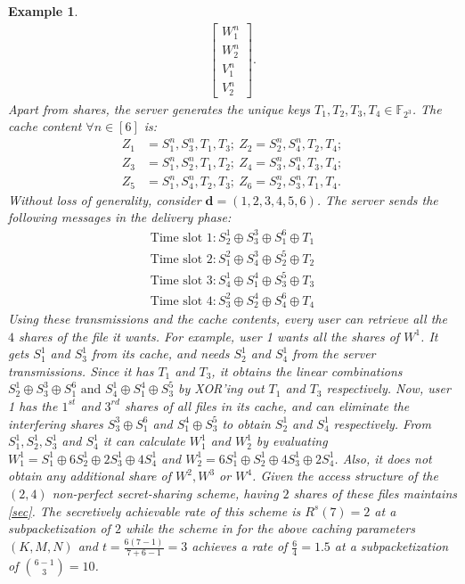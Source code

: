 \documentclass[conference]{IEEEtran}
\newtheorem{exmp}{Example}
\begin{document}
\begin{exmp}
\begin{align}
\begin{bmatrix}
	W^n_1\\W^n_2\\V^n_1\\V^n_2
	\end{bmatrix}.
	\end{align}
	Apart from shares, the server generates the unique keys $T_1,T_2,T_3,T_4\in \mathbb{F}_{2^3}$. The cache content $\forall n\in [6]$ is:
		\begin{align*}
		Z_1 & =S^n_1, S^n_3, T_1, T_3; \ 
		Z_2=S^n_2, S^n_4, T_2, T_4 ;\\ 
		Z_3 &=S^n_1, S^n_2, T_1, T_2; \
		Z_4 =S^n_3, S^n_4, T_3, T_4 ; \\
		Z_5 &=S^n_1, S^n_4, T_2, T_3; \
		Z_6 =S^n_2, S^n_3, T_1, T_4.
		\end{align*}
	Without loss of generality, consider $\mathbf{d}=(1,2,3,4,5,6)$. The server sends the following messages in the delivery phase:
	\begin{align*}
	\mbox{Time slot 1}: S^1_2\oplus S^3_3 \oplus S^6_1\oplus T_1\\
	\mbox{Time slot 2}: S^2_1\oplus S^3_4 \oplus S^5_2\oplus T_2\\
	\mbox{Time slot 3}: S^1_4\oplus S^4_1 \oplus S^5_3\oplus T_3\\
	\mbox{Time slot 4}: S^2_3\oplus S^4_2 \oplus S^6_4\oplus T_4
	\end{align*}
Using these transmissions and the cache contents, every user can retrieve all the $4$ shares of the file it wants. For example, user 1 wants all the shares of $W^1$. It gets $S^1_1$ and $S^1_3$ from its cache, and needs $S^1_2$ and $S^1_4$ from the server transmissions. Since it has $T_1$ and $T_3$, it obtains the linear combinations $S^1_2\oplus S^3_3 \oplus S^6_1 \text{ and } S^1_4\oplus S^4_1 \oplus S^5_3$ by XOR'ing out $T_1$ and $T_3$ respectively. Now, user 1 has the $1^{st}$ and $3^{rd}$ shares of all files in its cache, and can eliminate the interfering shares $S^3_3 \oplus S^6_1$ and $S^4_1 \oplus S^5_3$ to obtain $S^1_2$ and $S^1_4$ respectively. From $S^1_1,S^1_2,S^1_3$ and $S^1_4$ it can calculate $W^1_1$ and $W^1_2$ by evaluating $W^1_1=S^1_1\oplus 6S^1_2 \oplus 2S^1_3\oplus 4S^1_4$ and $W^1_2=6S^1_1\oplus S^1_2 \oplus 4S^1_3\oplus 2S^1_4$. Also, it does not obtain any additional share of $W^2,W^3$ or $W^4$. Given the access structure of the $(2,4)$ non-perfect secret-sharing scheme, having $2$ shares of these files maintains \eqref{sec}.
The  secretively achievable rate of this scheme is $R^s(7)=2$ at a subpacketization of $2$ while the scheme in \cite{PrivateCc} for the above caching parameters $(K,M,N)$ and $t=\frac{6(7-1)}{7+6-1}=3$ achieves a rate of $\frac{6}{4}=1.5$ at a subpacketization of $\binom{6-1}{3}=10$.
\end{exmp}
\end{document}
